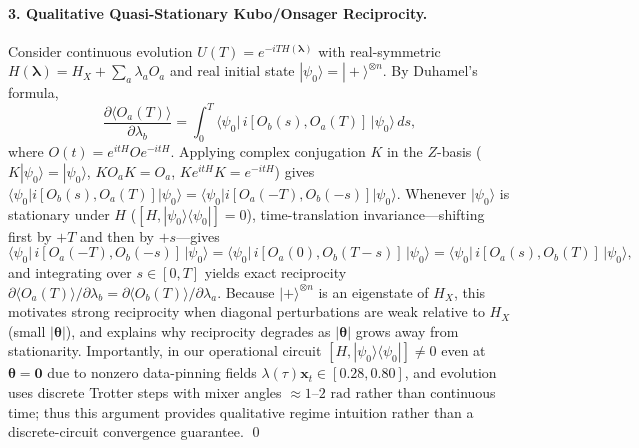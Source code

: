 \documentclass[11pt]{article}
\begin{document}
\paragraph{3. Qualitative Quasi-Stationary Kubo/Onsager Reciprocity.}
Consider continuous evolution $U(T)=e^{-iTH(\boldsymbol{\lambda})}$ with real-symmetric $H(\boldsymbol{\lambda}) = H_X + \sum_a \lambda_a O_a$ and real initial state $|\psi_0\rangle=|+\rangle^{\otimes n}$. By Duhamel's formula,
\begin{equation}
  \frac{\partial\langle O_a(T)\rangle}{\partial\lambda_b} = \int_0^T \langle\psi_0|\,i[O_b(s), O_a(T)]\,|\psi_0\rangle\,ds,
\end{equation}
where $O(t)=e^{itH}Oe^{-itH}$. Applying complex conjugation $K$ in the $Z$-basis ($K|\psi_0\rangle=|\psi_0\rangle$, $K O_a K=O_a$, $K e^{itH} K = e^{-itH}$) gives $\langle\psi_0|i[O_b(s), O_a(T)]|\psi_0\rangle = \langle\psi_0|i[O_a(-T), O_b(-s)]|\psi_0\rangle$. Whenever $|\psi_0\rangle$ is stationary under $H$ ($[H,|\psi_0\rangle\langle\psi_0|]=0$), time-translation invariance—shifting first by $+T$ and then by $+s$—gives
\begin{equation}
  \langle\psi_0|\,i[O_a(-T), O_b(-s)]\,|\psi_0\rangle = \langle\psi_0|\,i[O_a(0), O_b(T-s)]\,|\psi_0\rangle = \langle\psi_0|\,i[O_a(s), O_b(T)]\,|\psi_0\rangle,
\end{equation}
and integrating over $s\in[0,T]$ yields exact reciprocity $\partial\langle O_a(T)\rangle/\partial\lambda_b = \partial\langle O_b(T)\rangle/\partial\lambda_a$. Because $|+\rangle^{\otimes n}$ is an eigenstate of $H_X$, this motivates strong reciprocity when diagonal perturbations are weak relative to $H_X$ (small $|\boldsymbol{\theta}|$), and explains why reciprocity degrades as $|\boldsymbol{\theta}|$ grows away from stationarity. Importantly, in our operational circuit $[H, |\psi_0\rangle\langle\psi_0|]\neq 0$ even at $\boldsymbol{\theta}{=}\mathbf{0}$ due to nonzero data-pinning fields $\lambda(\tau)\mathbf{x}_t\in[0.28,0.80]$, and evolution uses discrete Trotter steps with mixer angles $\approx 1$--$2\text{ rad}$ rather than continuous time; thus this argument provides qualitative regime intuition rather than a discrete-circuit convergence guarantee. \qed
\end{document}
